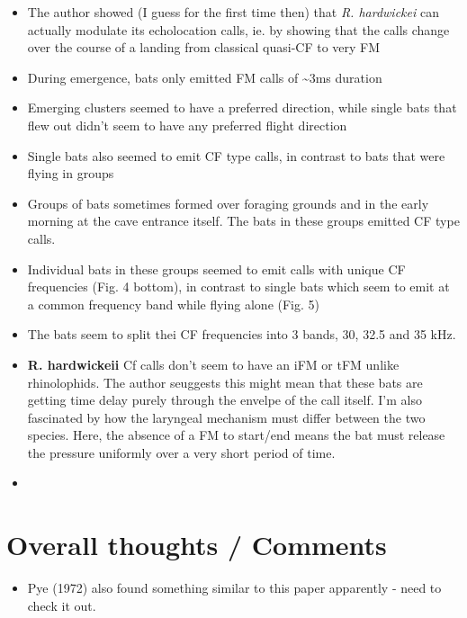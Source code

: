 \documentclass[
]{book}
\providecommand{\tightlist}{%
  \setlength{\itemsep}{0pt}\setlength{\parskip}{0pt}}
\begin{document}
\begin{itemize}
\item
  The author showed (I guess for the first time then) that \emph{R. hardwickei} can actually modulate its echolocation calls, ie. by showing that the calls change over the course of a landing from classical quasi-CF to very FM
\item
  During emergence, bats only emitted FM calls of \textasciitilde3ms duration
\item
  Emerging clusters seemed to have a preferred direction, while single bats that flew out didn't seem to have any preferred flight direction
\item
  Single bats also seemed to emit CF type calls, in contrast to bats that were flying in groups
\item
  Groups of bats sometimes formed over foraging grounds and in the early morning at the cave entrance itself. The bats in these groups emitted CF type calls.
\item
  Individual bats in these groups seemed to emit calls with unique CF frequencies (Fig. 4 bottom), in contrast to single bats which seem to emit at a common frequency band while flying alone (Fig. 5)
\item
  The bats seem to split thei CF frequencies into 3 bands, 30, 32.5 and 35 kHz.
\item
  \textbf{R. hardwickeii} Cf calls don't seem to have an iFM or tFM unlike rhinolophids. The author seuggests this might mean that these bats are getting time delay purely through the envelpe of the call itself. I'm also fascinated by how the laryngeal mechanism must differ between the two species. Here, the absence of a FM to start/end means the bat must release the pressure uniformly over a very short period of time.
\item
\end{itemize}

\hypertarget{overall-thoughts-comments}{%
\section{Overall thoughts / Comments}\label{overall-thoughts-comments}}

\begin{itemize}
\tightlist
\item
  Pye (1972) also found something similar to this paper apparently - need to check it out.
\end{itemize}

  
\end{document}
